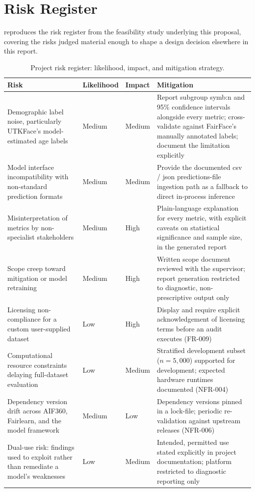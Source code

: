 \chapter{Risk Register}
\label{app:riskregister}

 reproduces the risk register from the feasibility study underlying this proposal, covering the risks judged material enough to shape a design decision elsewhere in this report.

\begin{table}[htbp]
    \centering
    \renewcommand{\arraystretch}{1.3}
    \caption{Project risk register: likelihood, impact, and mitigation strategy.}
    \label{tab:riskregister}
    \begin{tabular}{p{3cm}p{1.9cm}p{1.6cm}p{6.5cm}}
        \toprule
        \textbf{Risk} & \textbf{Likelihood} & \textbf{Impact} & \textbf{Mitigation} \\
        \midrule
        Demographic label noise, particularly UTKFace's model-estimated age labels & Medium & Medium & Report subgroup \gls{symb:n} and 95\% confidence intervals alongside every metric; cross-validate against FairFace's manually annotated labels; document the limitation explicitly \\
        Model interface incompatibility with non-standard prediction formats & Medium & Medium & Provide the documented \gls{csv} / \gls{json} predictions-file ingestion path as a fallback to direct in-process inference \\
        Misinterpretation of metrics by non-specialist stakeholders & Medium & High & Plain-language explanation for every metric, with explicit caveats on statistical significance and sample size, in the generated report \\
        Scope creep toward mitigation or model retraining & Medium & High & Written scope document reviewed with the supervisor; report generation restricted to diagnostic, non-prescriptive output only \\
        Licensing non-compliance for a custom user-supplied dataset & Low & High & Display and require explicit acknowledgement of licensing terms before an audit executes (FR-009) \\
        Computational resource constraints delaying full-dataset evaluation & Low & Medium & Stratified development subset ($n=5{,}000$) supported for development; expected hardware runtimes documented (NFR-004) \\
        Dependency version drift across AIF360, Fairlearn, and the model framework & Medium & Low & Dependency versions pinned in a lock-file; periodic re-validation against upstream releases (NFR-006) \\
        Dual-use risk: findings used to exploit rather than remediate a model's weaknesses & Low & Medium & Intended, permitted use stated explicitly in project documentation; platform restricted to diagnostic reporting only \\
        \bottomrule
    \end{tabular}
\end{table}
